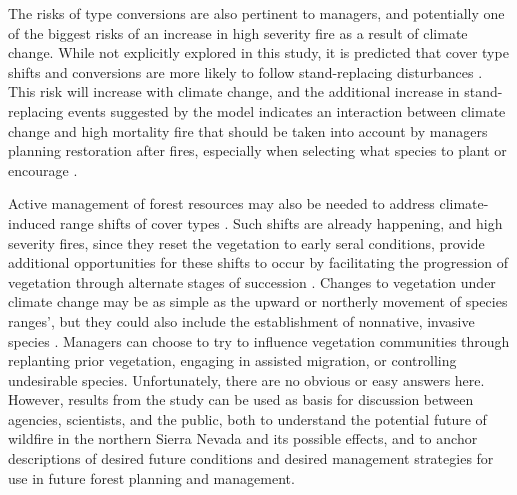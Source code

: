 The risks of type conversions are also pertinent to managers, and potentially one of the biggest risks of an increase in high severity fire as a result of climate change. While not explicitly explored in this study, it is predicted that cover type shifts and conversions are more likely to follow stand-replacing disturbances \citep{Stephens2013}. This risk will increase with climate change, and the additional increase in stand-replacing events suggested by the model indicates an interaction between climate change and high mortality fire that should be taken into account by managers planning restoration after fires, especially when selecting what species to plant or encourage \citep{Fule2008,Schwartz2015}. 

Active management of forest resources may also be needed to address climate-induced range shifts of cover types \citep{Keane2009}. Such shifts are already happening, and high severity fires, since they reset the vegetation to early seral conditions, provide additional opportunities for these shifts to occur by facilitating the progression of vegetation through alternate stages of succession \citep{Bachelet2001}. Changes to vegetation under climate change may be as simple as the upward or northerly movement of species ranges’, but they could also include the establishment of nonnative, invasive species \citep{McKenzie2004}. Managers can choose to try to influence vegetation communities through replanting prior vegetation, engaging in assisted migration, or controlling undesirable species. 
Unfortunately, there are no obvious or easy answers here. However, results from the study can be used as basis for discussion between agencies, scientists, and the public, both to understand the potential future of wildfire in the northern Sierra Nevada and its possible effects, and to anchor descriptions of desired future conditions and desired management strategies for use in future forest planning and management.






